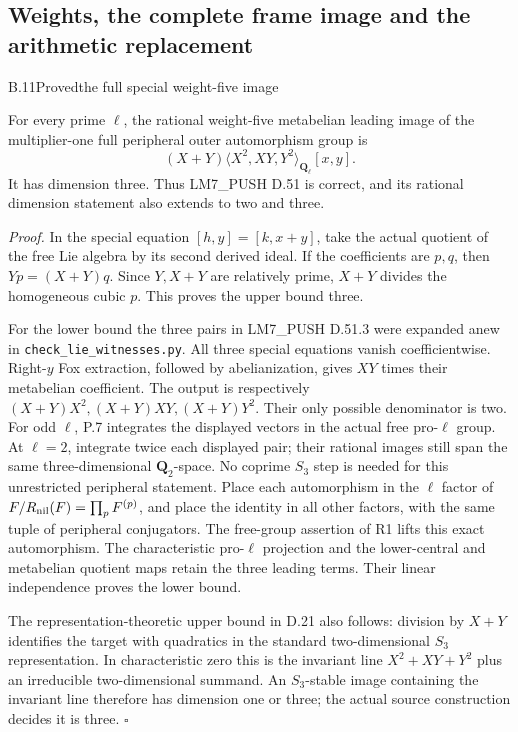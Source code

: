 \subsection{Weights, the complete frame image and the arithmetic replacement}


\begin{statement}{B.11}{Proved}{the full special weight-five image}
\end{statement}
For every prime $\ell$, the rational weight-five metabelian leading
image of the multiplier-one full peripheral outer automorphism
group is
\[
 (X+Y)\langle X^2,XY,Y^2\rangle_{\mathbf Q_\ell}[x,y].
\]
It has dimension three. Thus LM7\_PUSH D.51 is correct, and
its rational dimension statement also extends to two and three.

\emph{Proof.}
In the special equation $[h,y]=[k,x+y]$, take the actual quotient
of the free Lie algebra by its second derived ideal. If the
coefficients are $p,q$, then $Yp=(X+Y)q$. Since $Y,X+Y$ are
relatively prime, $X+Y$ divides the homogeneous cubic $p$.
This proves the upper bound three.

For the lower bound the three pairs in LM7\_PUSH D.51.3 were
expanded anew in \texttt{check\_lie\_witnesses.py}. All three
special equations vanish coefficientwise. Right-$y$ Fox
extraction, followed by abelianization, gives $XY$ times their
metabelian coefficient. The output is respectively
$(X+Y)X^2,(X+Y)XY,(X+Y)Y^2$. Their only possible denominator is
two. For odd $\ell$, P.7 integrates the displayed vectors in
the actual free pro-$\ell$ group. At $\ell=2$, integrate twice
each displayed pair; their rational images still span the same
three-dimensional $\mathbf Q_2$-space. No coprime $S_3$ step is
needed for this unrestricted peripheral statement.
Place each automorphism in the $\ell$ factor of
$F/R_{\rm nil}(F)=\prod_pF^{(p)}$, and place the identity in all
other factors, with the same tuple of peripheral conjugators.
The free-group assertion of R1 lifts this exact automorphism.
The characteristic pro-$\ell$ projection and the lower-central
and metabelian quotient maps retain the three leading terms.
Their linear independence proves the lower bound.

The representation-theoretic upper bound in D.21 also follows:
division by $X+Y$ identifies the target with quadratics in the
standard two-dimensional $S_3$ representation. In characteristic
zero this is the invariant line $X^2+XY+Y^2$ plus an irreducible
two-dimensional summand. An $S_3$-stable image containing the
invariant line therefore has dimension one or three; the actual
source construction decides it is three. \hfill$\square$

